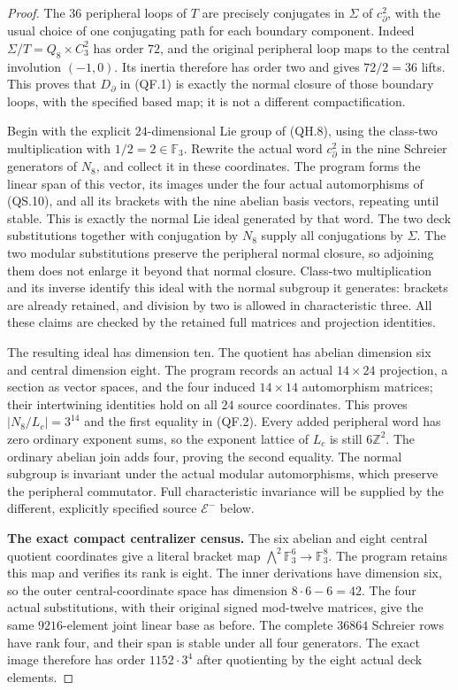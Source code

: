 \begin{proof}
The $36$ peripheral loops of $T$ are precisely conjugates
in $\Sigma$ of $c_\partial^2$, with the usual choice of
one conjugating path for each boundary component.
Indeed $\Sigma/T=Q_8\times C_3^2$ has order $72$,
and the original peripheral loop maps to the central
involution $(-1,0)$.  Its inertia therefore has order
two and gives $72/2=36$ lifts.  This proves that
$D_\partial$ in (QF.1) is exactly the normal closure of
those boundary loops, with the specified based map;
it is not a different compactification.

Begin with the explicit $24$-dimensional Lie group
of (QH.8), using the class-two multiplication with
$1/2=2\in\mathbb F_3$.  Rewrite the actual word
$c_\partial^2$ in the nine Schreier generators of
$N_8$, and collect it in these coordinates.  The
program forms the linear span of this vector, its
images under the four actual automorphisms of (QS.10),
and all its brackets with the nine abelian basis
vectors, repeating until stable.  This is exactly
the normal Lie ideal generated by that word.
The two deck substitutions together with conjugation
by $N_8$ supply all conjugations by $\Sigma$.
The two modular substitutions preserve the peripheral
normal closure, so adjoining them does not enlarge it
beyond that normal closure.  Class-two multiplication
and its inverse identify this ideal with the normal
subgroup it generates: brackets are already retained,
and division by two is allowed in characteristic
three.  All these claims are checked by the retained
full matrices and projection identities.

The resulting ideal has dimension ten.  The quotient
has abelian dimension six and central dimension eight.
The program records an actual $14\times24$ projection,
a section as vector spaces, and the four induced
$14\times14$ automorphism matrices; their intertwining
identities hold on all $24$ source coordinates.
This proves $|N_8/L_c|=3^{14}$ and the first equality
in (QF.2).  Every added peripheral word has zero
ordinary exponent sums, so the exponent lattice of
$L_c$ is still $6\mathbb Z^2$.  The ordinary abelian
join adds four, proving the second equality.
The normal subgroup is invariant under the actual
modular automorphisms, which preserve the peripheral
commutator.  Full characteristic invariance will be
supplied by the different, explicitly specified
source $\mathcal E^-$ below.

\textbf{The exact compact centralizer census.}
The six abelian and eight central quotient coordinates
give a literal bracket map
$\bigwedge^2\mathbb F_3^6\to\mathbb F_3^8$.
The program retains this map and verifies its rank
is eight.  The inner derivations have dimension six,
so the outer central-coordinate space has dimension
$8\cdot6-6=42$.  The four actual substitutions,
with their original signed mod-twelve matrices,
give the same $9216$-element joint linear base as
before.  The complete $36864$ Schreier rows have
rank four, and their span is stable under all four
generators.  The exact image therefore has order
$1152\cdot3^4$ after quotienting by the eight actual
deck elements.


\end{proof}
